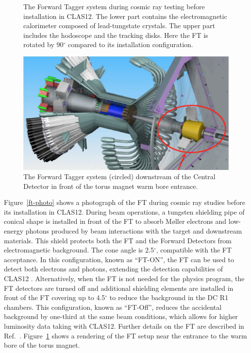 \documentclass[final,3p]{elsarticle}
\begin{document}
\begin{twocolumn}
\begin{figure}[t!]
\caption{The Forward Tagger system during cosmic ray testing before installation in CLAS12. The lower part contains
the electromagnetic calorimeter composed of lead-tungstate crystals. The upper part includes the hodoscope and the
tracking disks. Here the FT is rotated by 90$^\circ$ compared to its installation configuration.}
\label{ft-photo}
\vspace{1cm}\centerline{\includegraphics[width=1.0\columnwidth]{CD-FT.png}}
\caption{The Forward Tagger system (circled) downstream of the Central Detector in front of the torus magnet
  warm bore entrance.}
\label{ft}
\end{figure}

Figure~\ref{ft-photo} shows a photograph of the FT during cosmic ray studies before its installation in CLAS12.
During beam operations, a tungsten shielding pipe of conical shape is installed in front of the FT to absorb
M{\o}ller electrons and low-energy photons produced by beam interactions with the target and downstream materials.
This shield protects both the FT and the Forward Detectors from electromagnetic background. The cone angle is
2.5$^\circ$, compatible with the FT acceptance. In this configuration, known as ``FT-ON'', the FT can be used to
detect both electrons and photons, extending the detection capabilities of CLAS12 . Alternatively, when the FT is not
needed for the physics program, the FT detectors are turned off and additional shielding elements are installed in
front of the FT covering up to 4.5$^\circ$ to reduce the background in the DC R1 chambers. This configuration, known
as ``FT-Off'', reduces the accidental background by one-third at the same beam conditions, which allows for higher
luminosity data taking with CLAS12.  Further details on the FT are described in Ref.~\cite{FT}. Figure~\ref{ft} shows
a rendering of the FT setup near the entrance to the warm bore of the torus magnet.   


\end{twocolumn}
\end{document}
